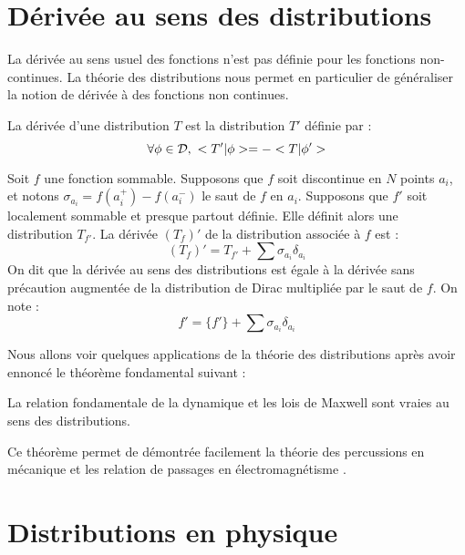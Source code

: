 \documentclass[12pt]{book}
\begin{document}
\section{D\'eriv\'ee au sens des distributions}
La d\'eriv\'ee au sens
usuel des fonctions n'est pas d\'efinie pour 
les fonctions non-continues.
La th\'eorie des distributions nous permet en particulier de
g\'en\'eraliser la notion de d\'eriv\'ee \`a des fonctions non
continues.
\begin{defn}
La d\'eriv\'ee d'une distribution $T$ est la distribution $T'$
d\'efinie par :
\begin{equation}
\forall \phi \in {\cal D},\ <T'|\phi>=-<T|\phi'>
\end{equation}
\end{defn}
\begin{defn}
Soit $f$ une fonction sommable. Supposons que $f$ soit
discontinue en $N$ points $a_i$, et notons
$\sigma_{a_i}=f(a_i^+)-f(a_i^-)$ le saut de $f$ en $a_i$.
Supposons que $f'$ soit localement sommable et presque partout
d\'efinie. Elle d\'efinit alors une distribution $T_{f'}$.
La d\'eriv\'ee $(T_f)'$ de la distribution associ\'ee \`a $f$ est :
\begin{equation}
(T_f)'=T_{f'}+\sum \sigma_{a_i} \delta_{a_i}
\end{equation}
On dit que la d\'eriv\'ee au sens des distributions est \'egale \`a la
d\'eriv\'ee sans pr\'ecaution augment\'ee de la distribution de Dirac
multipli\'ee par le saut de $f$. On note :
\begin{equation}
f'=\{f'\}+\sum \sigma_{a_i} \delta_{a_i}
\end{equation}
\end{defn}
Nous allons voir quelques applications de la th\'eorie des
distributions apr\`es avoir ennonc\'e le th\'eor\`eme fondamental suivant :
\begin{thm}
La relation fondamentale de la dynamique et les lois de Maxwell sont
vraies au sens des distributions.
\end{thm}
Ce th\'eor\`eme permet de d\'emontr\'ee facilement la th\'eorie des
percussions en m\'ecanique et les relation de passages en
\'electromagn\'etisme \cite{ph:elect:Petit89}. 
\section{Distributions en physique}
\end{document}
